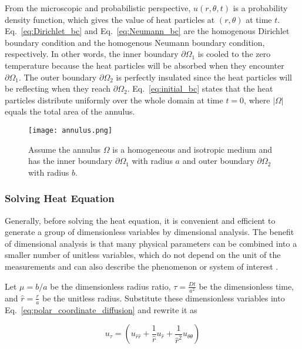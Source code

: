 From the microscopic and probabilistic perspective, $u(r, \theta, t)$
is a probability density function, which gives the value of heat
particles at $(r,\theta)$ at time $t$. Eq.~\ref{eq:Dirichlet_bc} and
Eq.~\ref{eq:Neumann_bc} are the homogenous Dirichlet boundary
condition and the homogenous Neumann boundary condition,
respectively. In other words, the inner boundary $\partial \Omega_{1}$
is cooled to the zero temperature because the heat particles will be
absorbed when they encounter $\partial \Omega_1$. The outer boundary
$\partial \Omega_{2}$ is perfectly insulated since the heat particles
will be reflecting when they reach $\partial
\Omega_2$. Eq.~\ref{eq:initial_bc} states that the heat particles
distribute uniformly over the whole domain at time $t=0$, where
$|\Omega|$ equals the total area of the annulus.


\begin{figure}
  \centering
  \texttt{[image: annulus.png]}
  \caption{Assume the annulus $\Omega$ is a homogeneous and isotropic
    medium and has the inner boundary $\partial \Omega_1$ with radius
    $a$ and outer boundary $\partial \Omega_2$ with radius
    $b$. \label{fig:annulus}}
\end{figure}



\subsubsection{Solving Heat Equation}

Generally, before solving the heat equation, it is convenient and
efficient to generate a group of dimensionless variables by
dimensional analysis. The benefit of dimensional analysis is that many
physical parameters can be combined into a smaller number of unitless
variables, which do not depend on the unit of the measurements and can
also describe the phenomenon or system of interest
\cite{barenblatt1996scaling}.


Let $\mu = b/a$ be the dimensionless radius ratio, $\tau =
\frac{Dt}{a^2}$ be the dimensionless time, and $\hat r = \frac{r}{a}$
be the unitless radius. Substitute these dimensionless variables into
Eq.~\ref{eq:polar_coordinate_diffusion} and rewrite it as

\begin{equation}\label{eq:DA_polar_diffusion}
  u_\tau = (u_{\hat r \hat r} + \frac{1}{\hat r} u_{\hat r} + \frac{1}{\hat r ^2} u_{\theta\theta})
\end{equation}

